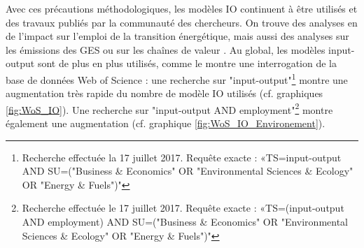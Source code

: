 Avec ces précautions méthodologiques, les modèles IO continuent à être utilisés et des travaux publiés par la communauté des chercheurs. On trouve des analyses en de l'impact sur l'emploi de la transition énergétique, mais aussi des analyses sur les émissions des GES ou sur les chaînes de valeur \citep{Timmer2014}.
Au global, les modèles input-output sont de plus en plus utilisés, comme le montre une interrogation de la base de données Web of Science : une recherche sur  "input-output"\footnote{Recherche effectuée la 17 juillet 2017. Requête exacte : «TS=input-output AND SU=("Business \& Economics" OR "Environmental Sciences \& Ecology" OR "Energy \& Fuels")"} montre une augmentation très rapide du nombre de modèle IO utilisés (cf. graphiques \ref{fig:WoS_IO}). Une recherche sur  "input-output AND employment"\footnote{Recherche effectuée le 17 juillet 2017. Requête exacte : «TS=(input-output AND employment) AND SU=("Business \& Economics" OR "Environmental Sciences \& Ecology" OR "Energy \& Fuels")"} montre également une augmentation (cf. graphique \ref{fig:WoS_IO_Environement}). 

\begin{figure}
	\centering
	 \qquad
\end{figure}






